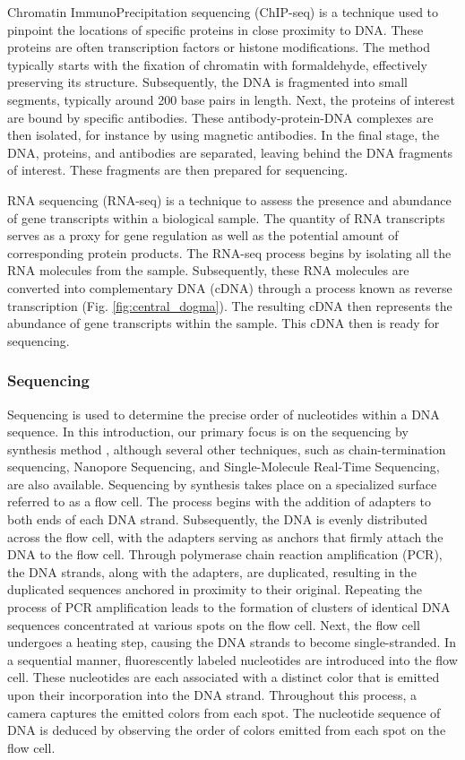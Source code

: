 Chromatin ImmunoPrecipitation sequencing (ChIP-seq) is a technique used to pinpoint the locations of specific proteins in close proximity to DNA\cite{Robertson_2007}. These proteins are often transcription factors or histone modifications. The method typically starts with the fixation of chromatin with formaldehyde, effectively preserving its structure. Subsequently, the DNA is fragmented into small segments, typically around 200 base pairs in length. Next, the proteins of interest are bound by specific antibodies. These antibody-protein-DNA complexes are then isolated, for instance by using magnetic antibodies. In the final stage, the DNA, proteins, and antibodies are separated, leaving behind the DNA fragments of interest. These fragments are then prepared for sequencing.

RNA sequencing (RNA-seq) is a technique to assess the presence and abundance of gene transcripts within a biological sample\cite{Nagalakshmi2008}. The quantity of RNA transcripts serves as a proxy for gene regulation as well as the potential amount of corresponding protein products. The RNA-seq process begins by isolating all the RNA molecules from the sample. Subsequently, these RNA molecules are converted into complementary DNA (cDNA) through a process known as reverse transcription (Fig. \ref{fig:central_dogma}). The resulting cDNA then represents the abundance of gene transcripts within the sample. This cDNA then is ready for sequencing.

\subsubsection{Sequencing}

Sequencing is used to determine the precise order of nucleotides within a DNA sequence. In this introduction, our primary focus is on the sequencing by synthesis method \cite{Canard1994}, although several other techniques, such as chain-termination sequencing\cite{Canard1994}, Nanopore Sequencing\cite{Jain2016}, and Single-Molecule Real-Time Sequencing\cite{Levene2003}, are also available. Sequencing by synthesis takes place on a specialized surface referred to as a flow cell. The process begins with the addition of adapters to both ends of each DNA strand. Subsequently, the DNA is evenly distributed across the flow cell, with the adapters serving as anchors that firmly attach the DNA to the flow cell. Through polymerase chain reaction amplification (PCR), the DNA strands, along with the adapters, are duplicated, resulting in the duplicated sequences anchored in proximity to their original. Repeating the process of PCR amplification leads to the formation of clusters of identical DNA sequences concentrated at various spots on the flow cell. Next, the flow cell undergoes a heating step, causing the DNA strands to become single-stranded. In a sequential manner, fluorescently labeled nucleotides are introduced into the flow cell. These nucleotides are each associated with a distinct color that is emitted upon their incorporation into the DNA strand. Throughout this process, a camera captures the emitted colors from each spot. The nucleotide sequence of DNA is deduced by observing the order of colors emitted from each spot on the flow cell.

